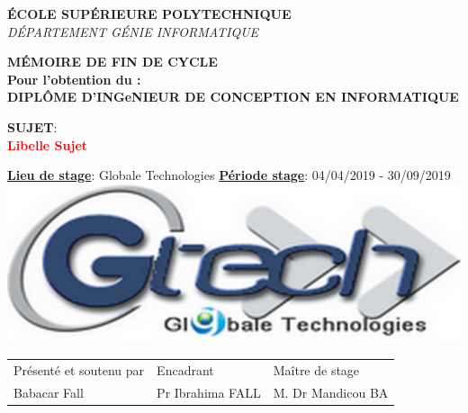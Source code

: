 \documentclass[a4paper, 12pt]{report}
\begin{document}
\begin{titlepage}
		\textsc{\small \textbf{ÉCOLE SUPÉRIEURE POLYTECHNIQUE}}\\[0.15cm] %
		\textsc{\small {\textit {DÉPARTEMENT GÉNIE INFORMATIQUE}}}\\[0.15cm] %
		
		\begin{tcolorbox}[colback=white,colframe=myblue]
			\centering
			\textcolor{myblue}{\small{\textbf{MÉMOIRE DE FIN DE CYCLE}}}\\
			\small{\textbf{Pour l’obtention du :} \\
				\textbf{DIPLÔME D'INGeNIEUR DE CONCEPTION EN INFORMATIQUE}} %
		\end{tcolorbox}
		
		\begin{tcolorbox}[colback=white,colframe=myblue]
			\centering
			\textbf{\small{SUJET}}: \\
			\textcolor{red}{\textbf {Libelle Sujet}} %
		\end{tcolorbox}
		
		
		
		\begin{tcolorbox}[colback=white,colframe=myblue]
			\small{\textbf{\underline{Lieu de stage}}: \textcolor{myblue}{Globale Technologies} \quad \textbf{\underline{Période stage}}: \textcolor{myblue}{04/04/2019 - 30/09/2019}}\\
			\centering
			\includegraphics[scale=.1]{img/gtech} %
		\end{tcolorbox}
		
		\begin{tcolorbox}[colback=white,colframe=myblue]
			\begin{tabular}{lll}
				Présenté et soutenu par & Encadrant & Maître de stage\\
				Babacar Fall & Pr Ibrahima FALL & M. Dr Mandicou BA
			\end{tabular}
		\end{tcolorbox}
		

\end{titlepage}
\end{document}
